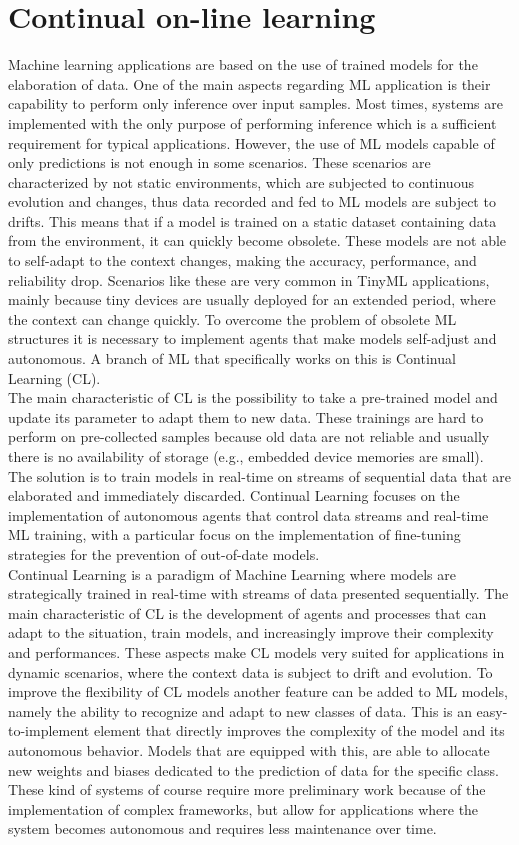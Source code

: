 \documentclass[12pt]{report}
\begin{document}
\section{Continual on-line learning}
Machine learning applications are based on the use of trained models for the elaboration of data. One of the main aspects regarding ML application is their capability to perform only inference over input samples. Most times, systems are implemented with the only purpose of performing inference which is a sufficient requirement for typical applications. However, the use of ML models capable of only predictions is not enough in some scenarios. These scenarios are characterized by not static environments, which are subjected to continuous evolution and changes, thus data recorded and fed to ML models are subject to drifts. This means that if a model is trained on a static dataset containing data from the environment, it can quickly become obsolete. These models are not able to self-adapt to the context changes, making the accuracy, performance, and reliability drop. Scenarios like these are very common in TinyML applications, mainly because tiny devices are usually deployed for an extended period, where the context can change quickly. To overcome the problem of obsolete ML structures it is necessary to implement agents that make models self-adjust and autonomous. A branch of ML that specifically works on this is Continual Learning (CL). \\
The main characteristic of CL is the possibility to take a pre-trained model and update its parameter to adapt them to new data. These trainings are hard to perform on pre-collected samples because old data are not reliable and usually there is no availability of storage (e.g., embedded device memories are small). The solution is to train models in real-time on streams of sequential data that are elaborated and immediately discarded. Continual Learning focuses on the implementation of autonomous agents that control data streams and real-time ML training, with a particular focus on the implementation of fine-tuning strategies for the prevention of out-of-date models.\\
Continual Learning is a paradigm of Machine Learning where models are strategically trained in real-time with streams of data presented sequentially. The main characteristic of CL is the development of agents and processes that can adapt to the situation, train models, and increasingly improve their complexity and performances. These aspects make CL models very suited for applications in dynamic scenarios, where the context data is subject to drift and evolution. To improve the flexibility of CL models another feature can be added to ML models, namely the ability to recognize and adapt to new classes of data. This is an easy-to-implement element that directly improves the complexity of the model and its autonomous behavior. Models that are equipped with this, are able to allocate new weights and biases dedicated to the prediction of data for the specific class. These kind of systems of course require more preliminary work because of the implementation of complex frameworks, but allow for applications where the system becomes autonomous and requires less maintenance over time. \\
\end{document}
